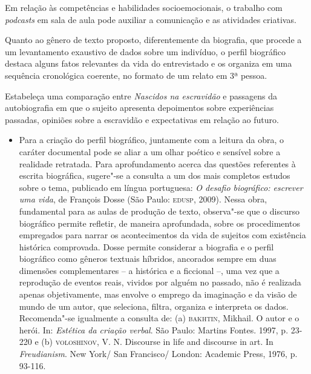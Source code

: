\documentclass[12pt]{extarticle}
\begin{document}
Em relação às competências e habilidades socioemocionais, o trabalho com
\emph{podcasts} em sala de aula pode auxiliar a comunicação e as
atividades criativas.

Quanto ao gênero de texto proposto, diferentemente da biografia, que
procede a um levantamento exaustivo de dados sobre um indivíduo, o
perfil biográfico destaca alguns fatos relevantes da vida do
entrevistado e os organiza em uma sequência cronológica coerente, no
formato de um relato em 3ª pessoa.

Estabeleça uma comparação entre \emph{Nascidos na escravidão} e
passagens da autobiografia em que o sujeito apresenta depoimentos sobre
experiências passadas, opiniões sobre a escravidão e expectativas em
relação ao futuro.

\begin{itemize}
\item
  Para a criação do perfil biográfico, juntamente com a leitura da obra,
  o caráter documental pode se aliar a um olhar poético e sensível sobre
  a realidade retratada. Para aprofundamento acerca das questões
  referentes à escrita biográfica, sugere"-se a consulta a um dos mais
  completos estudos sobre o tema, publicado em língua portuguesa:
  \emph{O desafio biográfico: escrever uma vida}, de François Dosse (São
  Paulo: \textsc{edusp}, 2009). Nessa obra, fundamental para as aulas de produção
  de texto, observa"-se que o discurso biográfico permite refletir, de
  maneira aprofundada, sobre os procedimentos empregados para narrar os
  acontecimentos da vida de sujeitos com existência histórica
  comprovada. Dosse permite considerar a biografia e o perfil biográfico
  como gêneros textuais híbridos, ancorados sempre em duas dimensões
  complementares -- a histórica e a ficcional --, uma vez que a
  reprodução de eventos reais, vividos por alguém no passado, não é
  realizada apenas objetivamente, mas envolve o emprego da imaginação e
  da visão de mundo de um autor, que seleciona, filtra, organiza e
  interpreta os dados. Recomenda"-se igualmente a consulta de: (a)
  \textsc{bakhtin}, Mikhail. O autor e o herói. In: \emph{Estética da criação
  verbal}. São Paulo: Martins Fontes. 1997, p. 23-220 e (b) \textsc{voloshinov},
  V. N. Discourse in life and discourse in art. In \emph{Freudianism}.
  New York/ San Francisco/ London: Academic Press, 1976, p. 93-116.
\end{itemize}
\end{document}
